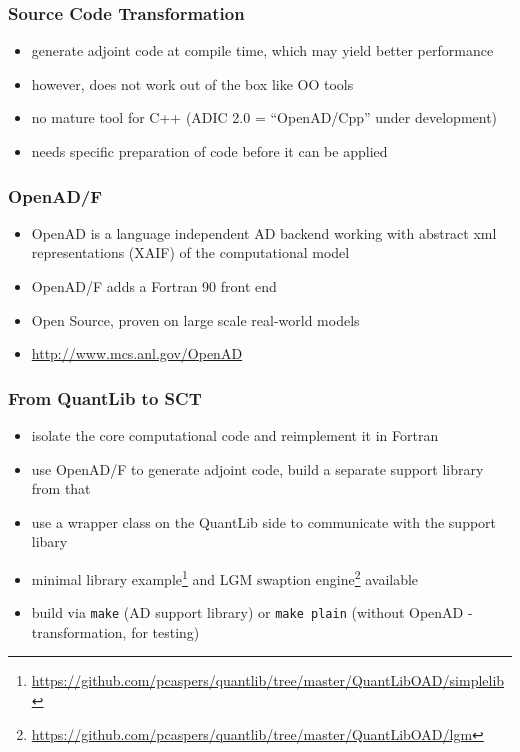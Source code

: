 \documentclass[10pt,German]{beamer}
\begin{document}
\begin{frame}[fragile]
\frametitle{Source Code Transformation}
\begin{itemize}
\item generate adjoint code at compile time, which may yield better performance
\item however, does not work out of the box like OO tools
\item no mature tool for C++ (ADIC 2.0 = ``OpenAD/Cpp'' under development)
\item needs specific preparation of code before it can be applied
\end{itemize}
\end{frame}

\begin{frame}[fragile]
\frametitle{OpenAD/F}
\begin{itemize}
\item OpenAD is a language independent AD backend working with abstract xml representations (XAIF) of the computational model
\item OpenAD/F adds a Fortran 90 front end
\item Open Source, proven on large scale real-world models
\item \url{http://www.mcs.anl.gov/OpenAD}
\end{itemize}
\end{frame}

\begin{frame}[fragile]
\frametitle{From QuantLib to SCT}
\begin{itemize}
\item isolate the core computational code and reimplement it in Fortran
\item use OpenAD/F to generate adjoint code, build a separate support library from that
\item use a wrapper class on the QuantLib side to communicate with the support libary
\item minimal library example\footnote{\tiny\url{https://github.com/pcaspers/quantlib/tree/master/QuantLibOAD/simplelib}} and LGM swaption engine\footnote{\tiny\url{https://github.com/pcaspers/quantlib/tree/master/QuantLibOAD/lgm}} available
\item build via \verb+make+ (AD support library) or \verb+make plain+ (without OpenAD - transformation, for testing)
\end{itemize}
\end{frame}
\end{document}
